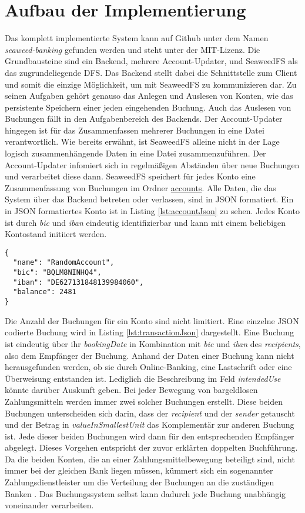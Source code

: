 \documentclass[12pt,oneside,a4paper,parskip]{scrbook}
\begin{document}
\section{Aufbau der Implementierung}
Das komplett implementierte System kann auf Github unter dem Namen \textit{seaweed-banking} gefunden werden und steht unter der MIT-Lizenz. Die Grundbausteine sind ein Backend, mehrere Account-Updater, und SeaweedFS als das zugrundeliegende DFS. Das Backend stellt dabei die Schnittstelle zum Client und somit die einzige Möglichkeit, um mit SeaweedFS zu kommunizieren dar. Zu seinen Aufgaben gehört genauso das Anlegen und Auslesen von Konten, wie das persistente Speichern einer jeden eingehenden Buchung. Auch das Auslesen von Buchungen fällt in den Aufgabenbereich des Backends. Der Account-Updater hingegen ist für das Zusammenfassen mehrerer Buchungen in eine Datei verantwortlich. Wie bereits erwähnt, ist SeaweedFS alleine nicht in der Lage logisch zusammenhängende Daten in eine Datei zusammenzuführen. Der Account-Updater infomiert sich in regelmäßigen Abständen über neue Buchungen und verarbeitet diese dann. SeaweedFS speichert für jedes Konto eine Zusammenfassung von Buchungen im Ordner \url{accounts}. Alle Daten, die das System über das Backend betreten oder verlassen, sind in JSON formatiert. Ein in JSON formatiertes Konto ist in Listing \ref{lst:accountJson} zu sehen. Jedes Konto ist durch \textit{bic} und \textit{iban} eindeutig identifizierbar und kann mit einem beliebigen Kontostand initiiert werden.

\begin{lstlisting}[label=lst:accountJson,
           language={},
           firstnumber=1,
           caption=Kontoobjekt in JSON-Format.]           
{
  "name": "RandomAccount",
  "bic": "BQLM8NINHQ4",
  "iban": "DE627131848139984060",
  "balance": 2481
}
\end{lstlisting}
Die Anzahl der Buchungen für ein Konto sind nicht limitiert. Eine einzelne JSON codierte Buchung wird in Listing \ref{lst:transactionJson} dargestellt. Eine Buchung ist eindeutig über ihr \textit{bookingDate} in Kombination mit \textit{bic} und \textit{iban} des \textit{recipients}, also dem Empfänger der Buchung. Anhand der Daten einer Buchung kann nicht herausgefunden werden, ob sie durch Online-Banking, eine Lastschrift oder eine Überweisung entstanden ist. Lediglich die Beschreibung im Feld \textit{intendedUse} könnte darüber Auskunft geben. Bei jeder Bewegung von bargeldlosen Zahlungsmitteln werden immer zwei solcher Buchungen erstellt. Diese beiden Buchungen unterscheiden sich darin, dass der \textit{recipient} und der \textit{sender} getauscht und der Betrag in \textit{valueInSmallestUnit} das Komplementär zur anderen Buchung ist. Jede dieser beiden Buchungen wird dann für den entsprechenden Empfänger abgelegt. Dieses Vorgehen entspricht der zuvor erklärten doppelten Buchführung. Da die beiden Konten, die an einer Zahlungsmittelbewegung beteiligt sind, nicht immer bei der gleichen Bank liegen müssen, kümmert sich ein sogenannter Zahlungsdienstleister um die Verteilung der Buchungen an die zuständigen Banken \cite{wiki:zahlungsdienstleister}. Das Buchungssystem selbst kann dadurch jede Buchung unabhängig voneinander verarbeiten.
\end{document}
